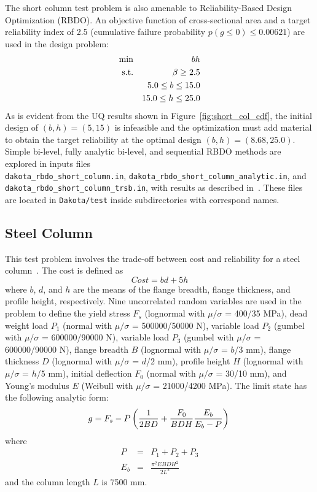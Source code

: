 The short column test problem is also amenable to Reliability-Based Design Optimization (RBDO). An
objective function of cross-sectional area and a target reliability
index of 2.5 (cumulative failure probability $p(g \le 0) \le 0.00621$) 
are used in the design problem:
\begin{eqnarray}
\min       & & bh \nonumber \\
{\rm s.t.} & & \beta \geq 2.5 \nonumber \\
           & &  5.0 \leq b \leq 15.0 \nonumber \\
           & & 15.0 \leq h \leq 25.0
\end{eqnarray}
As is evident from the UQ results shown in
Figure~\ref{fig:short_col_cdf}, the initial design of $(b, h) = (5,
15)$ is infeasible and the optimization must add material to obtain
the target reliability at the optimal design $(b, h) = (8.68, 25.0)$.
Simple bi-level, fully analytic bi-level, and sequential RBDO methods
are explored in inputs files \\
\texttt{dakota\_rbdo\_short\_column.in},
\texttt{dakota\_rbdo\_short\_column\_analytic.in}, and\\
\texttt{dakota\_rbdo\_short\_column\_trsb.in}, with results as
described in~\cite{Eld05,Eld06a}. These files are located in {\tt Dakota/test}
inside subdirectories with correspond names.

\subsection{Steel Column}\label{additional:steel_column}

This test problem involves the trade-off between cost and
reliability for a steel column~\cite{Kus97}. The cost is defined as
\begin{equation}
Cost = b d + 5 h
\end{equation}
where $b$, $d$, and $h$ are the means of the flange breadth, flange
thickness, and profile height, respectively. Nine uncorrelated random
variables are used in the problem to define the yield stress $F_s$
(lognormal with $\mu/\sigma$ = 400/35 MPa), dead weight load $P_1$
(normal with $\mu/\sigma$ = 500000/50000 N), variable load $P_2$
(gumbel with $\mu/\sigma$ = 600000/90000 N), variable load $P_3$
(gumbel with $\mu/\sigma$ = 600000/90000 N), flange breadth $B$
(lognormal with $\mu/\sigma$ = $b$/3 mm), flange thickness $D$
(lognormal with $\mu/\sigma$ = $d$/2 mm), profile height $H$
(lognormal with $\mu/\sigma$ = $h$/5 mm), initial deflection $F_0$
(normal with $\mu/\sigma$ = 30/10 mm), and Young's modulus $E$ (Weibull
with $\mu/\sigma$ = 21000/4200 MPa). The limit state has the
following analytic form:
\begin{equation}
g = F_s - P \left( \frac{1}{2 B D} + 
\frac{F_0}{B D H} \frac{E_b}{E_b - P} \right)\\
\end{equation}
where
\begin{eqnarray}
P   & = & P_1 + P_2 + P_3 \\
E_b & = & \frac{\pi^2 E B D H^2}{2 L^2}
\end{eqnarray}
and the column length $L$ is 7500 mm.

